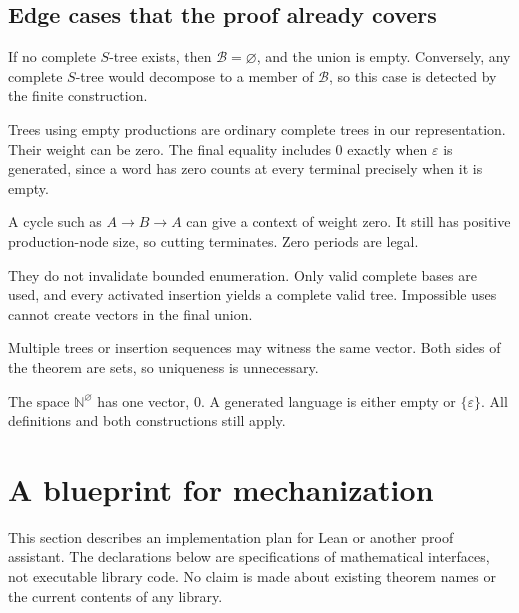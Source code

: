 \documentclass[11pt,a4paper]{article}
\numberwithin{equation}{section}
\theoremstyle{plain}
\theoremstyle{definition}
\theoremstyle{remark}
\newcommand{\N}{\mathbb N}
\newcommand{\eps}{\varepsilon}
\newcommand{\Bases}{\mathcal B}
\begin{document}
\subsection{Edge cases that the proof already covers}
\begin{description}[style=nextline,leftmargin=0pt,labelwidth=0pt,labelsep=0pt]
\item[The empty language.]
If no complete $S$-tree exists, then $\Bases=\varnothing$, and the union is empty. Conversely, any complete $S$-tree would decompose to a member of $\Bases$, so this case is detected by the finite construction.
\item[The empty word.]
Trees using empty productions are ordinary complete trees in our representation. Their weight can be zero. The final equality includes $0$ exactly when $\eps$ is generated, since a word has zero counts at every terminal precisely when it is empty.
\item[Unit and silent cycles.]
A cycle such as $A\to B\to A$ can give a context of weight zero. It still has positive production-node size, so cutting terminates. Zero periods are legal.
\item[Unreachable or unproductive nonterminals.]
They do not invalidate bounded enumeration. Only valid complete bases are used, and every activated insertion yields a complete valid tree. Impossible uses cannot create vectors in the final union.
\item[Ambiguity.]
Multiple trees or insertion sequences may witness the same vector. Both sides of the theorem are sets, so uniqueness is unnecessary.
\item[The empty terminal alphabet.]
The space $\N^{\varnothing}$ has one vector, $0$. A generated language is either empty or $\{\eps\}$. All definitions and both constructions still apply.
\end{description}

\section{A blueprint for mechanization}\label{sec:formalization}

This section describes an implementation plan for Lean or another proof assistant. The declarations below are specifications of mathematical interfaces, not executable library code. No claim is made about existing theorem names or the current contents of any library.
\end{document}
